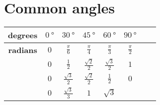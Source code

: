 \section*{Common angles}


\begin{table}[!ht]
\setlength{\tabcolsep}{1em} %
\centering
  \tabulinesep=1.5mm
  \begin{tabu}{|c|c|c|c|c|c|c|c|}
    \hline
    \textbf{\bm{$\alpha$} degrees}
      & $\SI{0}{\degree}$
      & $\SI{30}{\degree}$
      & $\SI{45}{\degree}$
      & $\SI{60}{\degree}$
      & $\SI{90}{\degree}$\\
    \hline
    \textbf{\bm{$\alpha$} radians}
      & $\displaystyle 0$
      & $\displaystyle \frac{\pi}{6}$
      & $\displaystyle \frac{\pi}{4}$
      & $\displaystyle \frac{\pi}{3}$
      & $\displaystyle \frac{\pi}{2}$\\
    \hline
    \textbf{\bm{$\sin \theta$}}
      & $\displaystyle 0$
      & $\displaystyle \frac{1}{2}$
      & $\displaystyle \frac{\sqrt 2}{2}$
      & $\displaystyle \frac{\sqrt 3}{2}$
      & $\displaystyle 1$\\
    \hline
    \textbf{\bm{$\cos \theta$}}
      & $\displaystyle 0$
      & $\displaystyle \frac{\sqrt 3}{2}$
      & $\displaystyle \frac{\sqrt 2}{2}$
      & $\displaystyle \frac{1}{2}$
      & $\displaystyle 0$\\
    \hline
    \textbf{\bm{$\tan \theta$}}
      & $\displaystyle 0$
      & $\displaystyle \frac{\sqrt 3}{3}$
      & $\displaystyle 1$
      & $\displaystyle \sqrt 3$
      &\\
    \hline
  \end{tabu}
\end{table}